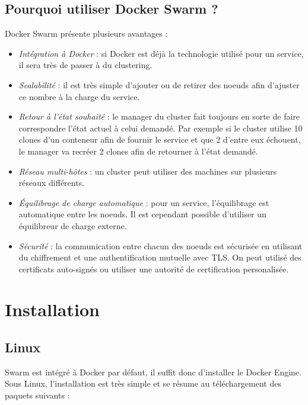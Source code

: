 \section{Pourquoi utiliser Docker Swarm ?}

Docker Swarm présente plusieurs avantages :
\begin{itemize}
    \item \emph{Intégration à Docker} : si Docker est déjà la technologie utilisé pour un service,
        il sera très de passer à du clustering.

    \item \emph{Scalabilité} : il est très simple d'ajouter ou de retirer des noeuds afin d'ajuster
        ce nombre à la charge du service.

    \item \emph{Retour à l'état souhaité} : le manager du cluster fait toujours en sorte de faire
        correspondre l'état actuel à celui demandé. Par exemple si le cluster utilise 10 clones
        d'un conteneur afin de fournir le service et que 2 d'entre eux échouent, le manager va
        recréer 2 clones afin de retourner à l'état demandé.

    \item \emph{Réseau multi-hôtes} : un cluster peut utiliser des machines sur plusieurs réseaux
        différents.

    \item \emph{Équilibrage de charge automatique} : pour un service, l'équilibrage est automatique
        entre les noeuds. Il est cependant possible d'utiliser un équilibreur de charge externe.
    
    \item \emph{Sécurité} : la communication entre chacun des noeuds est sécurisée en utilisant
        du chiffrement et une authentification mutuelle avec TLS. On peut utilisé des certificats
        auto-signés ou utiliser une autorité de certification personalisée.
\end{itemize}

\chapter{Installation}

\section{Linux}

Swarm est intégré à Docker par défaut, il suffit donc d'installer le Docker Engine.
Sous Linux, l'installation est très simple et se résume au téléchargement des paquets suivants :

